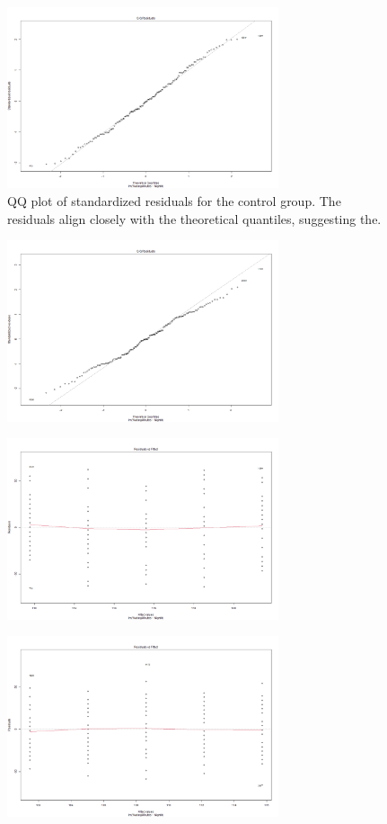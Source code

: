 \documentclass[10pt,preprintnumbers,amsmath,amssymb,floatfix,twocolumn,prl]{revtex4-2}
\begin{document}
\begin{figure}
\centering
\includegraphics[width = 8cm, height = 6m]{QQ_control.png}
\caption{QQ plot of standardized residuals for the control group. The residuals align closely with the theoretical quantiles, suggesting the.}
\end{figure}

\begin{figure}
\centering
\includegraphics[width = 8cm, height = 6m]{QQ_valerian.png}
\caption{}
\end{figure}

\begin{figure}
\centering
\includegraphics[width = 8cm, height = 6m]{residual_fitted_control.png}
\caption{}
\end{figure}

\begin{figure}
\centering
\includegraphics[width = 8cm, height = 6m]{residual_fitted_valerian.png}
\caption{}
\end{figure}




\end{document}
